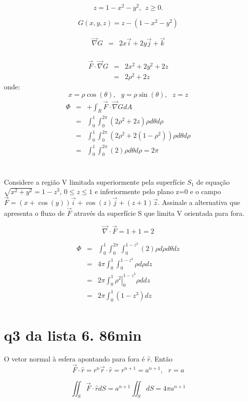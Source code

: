 \documentclass[a4paper,10pt]{book}
\begin{document}
$$z={1-x^2-y^2}, ~~z\geq 0.$$

$$G(x,y,z)=z-({1-x^2-y^2})$$

\begin{eqnarray*}
 \vec{\nabla}G&=& 2x\vec{i}+2y\vec{j} + \vec{k}\\
   \end{eqnarray*}

\begin{eqnarray*}
 \vec{F}\cdot\vec{\nabla}G&=&  
 2x^2+2y^2+2z\\
 &=&2\rho^2+2z
 \end{eqnarray*}
onde:
$$x=\rho\cos(\theta), ~~~y=\rho\sin(\theta), ~~~z=z$$
  \begin{eqnarray*}
\Phi&=&+\int_R\vec{F}\cdot\vec{\nabla}GdA\\
&=&\int_0^1\int_0^{2\pi}\left(2\rho^2+2z\right)\rho d\theta d\rho\\
&=&\int_0^1\int_0^{2\pi}\left(2\rho^2+2(1-\rho^2)\right)\rho d\theta d\rho\\
&=&\int_0^1\int_0^{2\pi}(2)\rho d\theta d\rho=2\pi
  \end{eqnarray*}
 
 \section{}
 Considere a região V limitada superiormente pela superfície $S_1$ de equação $\sqrt {x^2+y^2}= 1-z^3$,  $0\leq z \leq 1$ e inferiormente pelo plano z=0 e o campo $\vec {F}=(x+\cos (y))\vec {i}+\cos (z)\vec {j}+(z+1)\vec {z}$. Assinale a alternativa que apresenta o fluxo de $\vec {F}$ através da superfície S que limita V orientada para fora.
 
 
 $$\vec{\nabla}\cdot \vec{F}=1+1=2$$
 
 \begin{eqnarray*}\Phi
  &=&\int_0^1\int_0^{2\pi}\int_0^{1-z^3} (2)\rho d\rho d\theta dz\\
  &=&4\pi\int_0^1\int_0^{1-z^3} \rho d\rho  dz\\
  &=&2\pi\int_0^1\left.\rho^2\right|_0^{1-z^3} \rho d  dz\\
  &=&2\pi\int_0^1(1-z^3)  dz\\
 \end{eqnarray*}

 \section{q3 da lista 6. 86min}
 
 O vetor normal à esfera apontando para fora é $\hat{r}$.
 Então
 $$\vec{F}\cdot \hat{r}=r^n\vec{r}\cdot \hat{r}=r^{n+1}=a^{n+1},~~~r=a$$
 
 $$\iint_S\vec{F}\cdot \hat{r}dS = a^{n+1}\iint_SdS=4\pi a^{n+1}$$
\end{document}
